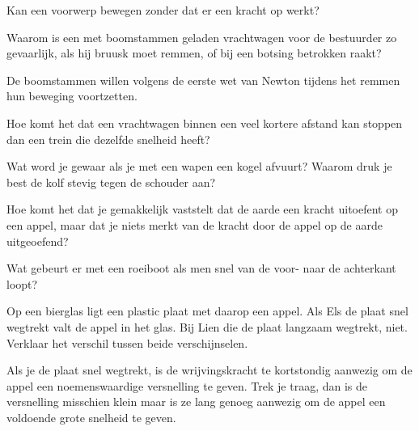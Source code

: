 \documentclass{ximera}
\begin{document}
	\author{Bart Lambregs}
    \xmsource\xmuitleg



\begin{exercise}
	Kan een voorwerp bewegen zonder dat er een kracht op werkt?%
\end{exercise}

\begin{exercise}
	Waarom is een met boomstammen geladen vrachtwagen voor de bestuurder zo gevaarlijk, als hij bruusk moet remmen, of bij een botsing betrokken raakt?

	\begin{oplossing}
		De boomstammen willen volgens de eerste wet van Newton tijdens het remmen hun beweging voortzetten.
	\end{oplossing}
\end{exercise}

\begin{exercise}
	Hoe komt het dat een vrachtwagen binnen een veel kortere afstand kan stoppen dan een trein die dezelfde snelheid heeft?
\end{exercise}

\begin{exercise}
	Wat word je gewaar als je met een wapen een kogel afvuurt? Waarom druk je best de kolf stevig tegen de schouder aan?
\end{exercise}

\begin{exercise}
	Hoe komt het dat je gemakkelijk vaststelt dat de aarde een kracht uitoefent op een appel, maar dat je niets merkt van de kracht door de appel op de aarde uitgeoefend?
\end{exercise}

\begin{exercise}
	Wat gebeurt er met een roeiboot als men snel van de voor- naar de achterkant loopt?
\end{exercise}

\begin{exercise}
	Op een bierglas ligt een plastic plaat met daarop een appel. Als Els de plaat snel wegtrekt valt de appel in het glas. Bij Lien die de plaat langzaam wegtrekt, niet. Verklaar het verschil tussen beide verschijnselen.

	\begin{oplossing}
		Als je de plaat snel wegtrekt, is de wrijvingskracht te kortstondig aanwezig om de appel een noemenswaardige versnelling te geven. Trek je traag, dan is de versnelling misschien klein maar is ze lang genoeg aanwezig om de appel een voldoende grote snelheid te geven.
	\end{oplossing}
\end{exercise}
\end{document}
